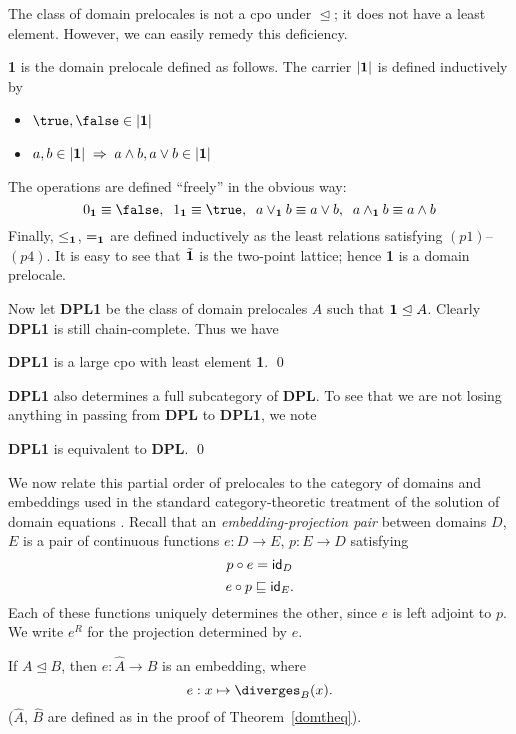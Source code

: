 The class of domain prelocales is not a cpo under $\trianglelefteq$; it does not have a least element. However, we can easily remedy this deficiency.
\begin{definition} 
{\rm {\bf 1} is the domain prelocale defined as follows. 
The carrier $|{\bf 1}|$ is defined inductively by
\begin{itemize}
\item $\true , \false \in |{\bf 1}|$
\item $a, b \in |{\bf 1}| \; \Rightarrow \; a \wedge b, a \vee b \in |{\bf 1}|$
\end{itemize}
The operations are defined ``freely'' in the obvious way:
\[0_{{\bf 1}} \equiv \false , \;\; 1_{{\bf 1}} \equiv \true , \;\; a \vee_{{\bf 1}} b \equiv a \vee b , \;\; a \wedge_{{\bf 1}} b \equiv a \wedge b \]
Finally, $\leq_{{\bf 1}}$, $=_{{\bf 1}}$ are defined inductively as the least relations satisfying $(p1)$--$(p4)$.
It is easy to see that $\tilde{{\bf 1}}$ is the two-point lattice; hence {\bf 1} is a domain prelocale.}
\end{definition}
Now let {\bf DPL1} be the class of domain prelocales $A$ such that ${\bf 1} \trianglelefteq A$. Clearly {\bf DPL1} is still chain-complete. Thus we have
\begin{proposition}
{\bf DPL1} is a large cpo with least element {\bf 1}. \qed
\end{proposition}
{\bf DPL1} also determines a full subcategory of {\bf DPL}. To see that we are not losing anything in passing from {\bf DPL} to {\bf DPL1}, we note
\begin{proposition}
{\bf DPL1} is equivalent to {\bf DPL}. \qed
\end{proposition}

We now relate this partial order of prelocales to the category of domains and 
embeddings used in the standard category-theoretic treatment of the solution 
of domain equations \cite{SP82}. 
Recall that an {\it embedding-projection pair} between domains $D$, $E$ 
is a pair of continuous functions $e : D \rightarrow E$, $p : E \rightarrow D$ satisfying
\[p \circ e = {\sf id}_{D} \]
\[ e \circ p \sqsubseteq {\sf id}_{E}. \]
Each of these functions uniquely determines the other, since $e$ is left adjoint to $p$. We write $e^{R}$ for the projection determined by $e$.
\begin{proposition}
If $A \trianglelefteq B$, then $e : \hat{A} \rightarrow \hat{B}$ is an 
embedding, where 
\[ e : x \mapsto \diverges_{B}(x). \]
($\hat{A}$, $\hat{B}$ are defined as in the proof of Theorem~\ref{domtheq}).
\end{proposition}

